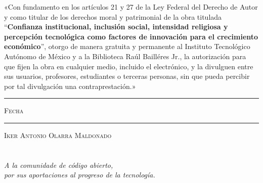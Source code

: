 \documentclass[11pt, oneside]{book}
\begin{document}

\thispagestyle{empty}

\vspace*{\fill}
\begingroup

\noindent
«Con fundamento en los artículos 21 y 27 de la Ley Federal del Derecho de Autor y como titular de los derechos moral y patrimonial de la obra titulada ``\textbf{Confianza institucional, inclusión social, intensidad religiosa y percepción tecnológica como factores de innovación para el crecimiento económico}'', otorgo de manera gratuita y permanente al Instituto Tecnológico Autónomo de México y a la Biblioteca Raúl Bailléres Jr., la autorización para que fijen la obra en cualquier medio, incluido el electrónico, y la divulguen entre sus usuarios, profesores, estudiantes o terceras personas, sin que pueda percibir por tal divulgación una contraprestación.»


\centering 

\vspace{5em}

\rule[1em]{20em}{0.5pt} %

\textsc{Fecha}
 
\vspace{8em}

\rule[1em]{20em}{0.5pt} %

\textsc{Iker Antonio Olarra Maldonado}

\endgroup
\vspace*{\fill}


\pagestyle{plain}
\frontmatter

\chapter*{}
\begin{flushright}
\textit{A la comunidade de código abierto,\\ por sus aportaciones al progreso de la tecnología.}
\end{flushright}
\end{document}
